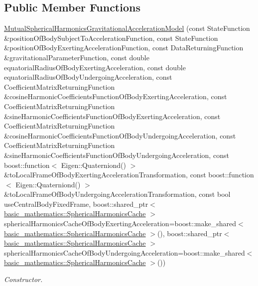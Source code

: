 \subsection*{Public Member Functions}
\begin{DoxyCompactItemize}
\item 
\hyperlink{classtudat_1_1gravitation_1_1MutualSphericalHarmonicsGravitationalAccelerationModel_a00f2bb7e1498d6082d6aeef80f2db742}{Mutual\+Spherical\+Harmonics\+Gravitational\+Acceleration\+Model} (const State\+Function \&position\+Of\+Body\+Subject\+To\+Acceleration\+Function, const State\+Function \&position\+Of\+Body\+Exerting\+Acceleration\+Function, const Data\+Returning\+Function \&gravitational\+Parameter\+Function, const double equatorial\+Radius\+Of\+Body\+Exerting\+Acceleration, const double equatorial\+Radius\+Of\+Body\+Undergoing\+Acceleration, const Coefficient\+Matrix\+Returning\+Function \&cosine\+Harmonic\+Coefficients\+Function\+Of\+Body\+Exerting\+Acceleration, const Coefficient\+Matrix\+Returning\+Function \&sine\+Harmonic\+Coefficients\+Function\+Of\+Body\+Exerting\+Acceleration, const Coefficient\+Matrix\+Returning\+Function \&cosine\+Harmonic\+Coefficients\+Function\+Of\+Body\+Undergoing\+Acceleration, const Coefficient\+Matrix\+Returning\+Function \&sine\+Harmonic\+Coefficients\+Function\+Of\+Body\+Undergoing\+Acceleration, const boost\+::function$<$ Eigen\+::\+Quaterniond() $>$ \&to\+Local\+Frame\+Of\+Body\+Exerting\+Acceleration\+Transformation, const boost\+::function$<$ Eigen\+::\+Quaterniond() $>$ \&to\+Local\+Frame\+Of\+Body\+Undergoing\+Acceleration\+Transformation, const bool use\+Central\+Body\+Fixed\+Frame, boost\+::shared\+\_\+ptr$<$ \hyperlink{classtudat_1_1basic__mathematics_1_1SphericalHarmonicsCache}{basic\+\_\+mathematics\+::\+Spherical\+Harmonics\+Cache} $>$ spherical\+Harmonics\+Cache\+Of\+Body\+Exerting\+Acceleration=boost\+::make\+\_\+shared$<$ \hyperlink{classtudat_1_1basic__mathematics_1_1SphericalHarmonicsCache}{basic\+\_\+mathematics\+::\+Spherical\+Harmonics\+Cache} $>$(), boost\+::shared\+\_\+ptr$<$ \hyperlink{classtudat_1_1basic__mathematics_1_1SphericalHarmonicsCache}{basic\+\_\+mathematics\+::\+Spherical\+Harmonics\+Cache} $>$ spherical\+Harmonics\+Cache\+Of\+Body\+Undergoing\+Acceleration=boost\+::make\+\_\+shared$<$ \hyperlink{classtudat_1_1basic__mathematics_1_1SphericalHarmonicsCache}{basic\+\_\+mathematics\+::\+Spherical\+Harmonics\+Cache} $>$())
\begin{DoxyCompactList}\small\item\em Constructor. \end{DoxyCompactList}\item 

\end{DoxyCompactItemize}

